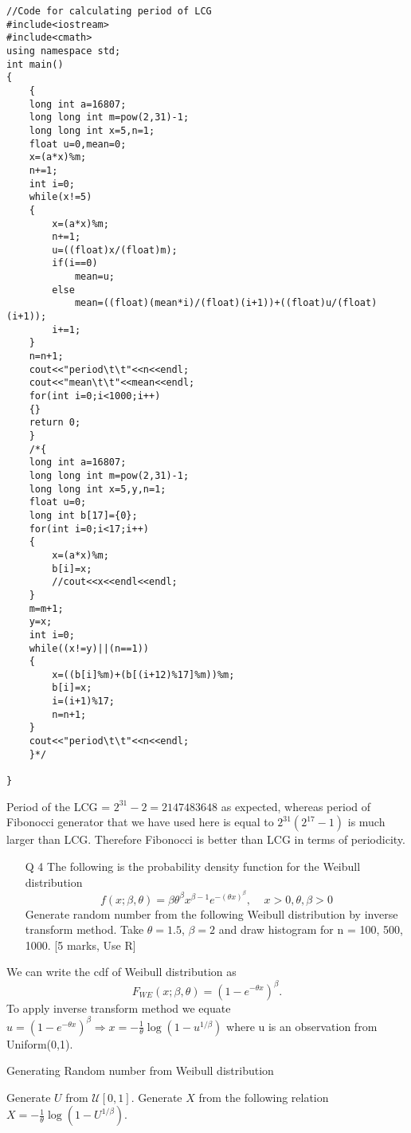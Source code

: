 \documentclass[11pt]{article}
\begin{document}
\begin{lstlisting}
//Code for calculating period of LCG
#include<iostream>
#include<cmath>
using namespace std;
int main()
{
	{
	long int a=16807;
	long long int m=pow(2,31)-1;
	long long int x=5,n=1;
	float u=0,mean=0;
	x=(a*x)%m;
	n+=1;
	int i=0;
	while(x!=5)
	{
		x=(a*x)%m;
		n+=1;
		u=((float)x/(float)m);
		if(i==0)
			mean=u;
		else
			mean=((float)(mean*i)/(float)(i+1))+((float)u/(float)(i+1));
		i+=1;
	}
	n=n+1;
	cout<<"period\t\t"<<n<<endl;
	cout<<"mean\t\t"<<mean<<endl;
	for(int i=0;i<1000;i++)
	{}
	return 0;
	}
	/*{
	long int a=16807;
	long long int m=pow(2,31)-1;
	long long int x=5,y,n=1;
	float u=0;
	long int b[17]={0};
	for(int i=0;i<17;i++)
	{
		x=(a*x)%m;
		b[i]=x;
		//cout<<x<<endl<<endl;
	}
	m=m+1;
	y=x;
	int i=0;
	while((x!=y)||(n==1))
	{
		x=((b[i]%m)+(b[(i+12)%17]%m))%m;
		b[i]=x;
		i=(i+1)%17;
		n=n+1;
	}
	cout<<"period\t\t"<<n<<endl;
	}*/
	
}
\end{lstlisting}

  Period of the LCG = $2^{31} - 2= 2147483648$ as expected, whereas period of Fibonocci generator that we have used here is equal to $2^{31}(2^{17} - 1)$ is much larger than LCG.  Therefore Fibonocci is better than LCG in terms of periodicity.

\begin{enumerate}
\item[Q 4] The following is the probability density function for the Weibull distribution 
$$ f(x; \beta, \theta) = \beta \theta^{\beta} x^{\beta - 1} e^{-(\theta x)^{\beta}}, ~~~~~ x > 0 , \theta, \beta > 0  $$
Generate random number from the following Weibull distribution by inverse transform method.  Take $\theta = 1.5$, $\beta = 2$ and draw histogram for n = 100, 500, 1000. [5 marks, Use R]
\end{enumerate}

  We can write the cdf of Weibull distribution as $$ F_{WE}(x; \beta, \theta) = (1 - e^{-\theta x})^{\beta}.$$  To apply inverse transform method we equate $u = (1 - e^{-\theta x})^{\beta}  \Rightarrow   x = - \frac{1}{\theta}\log(1 - u^{1/\beta})$ where u is an observation from Uniform(0,1).

\begin{algorithm}[H]
\caption{Generating Random number from Weibull distribution}
\begin{algorithmic}[1]
\STATE Generate $U$ from $\mathcal{U}[0,1]$.
\STATE Generate $X$ from the following relation $X = - \frac{1}{\theta}\log(1 - U^{1/\beta})$.
\end{algorithmic}
\end{algorithm}
\end{document}
